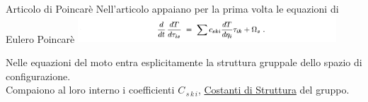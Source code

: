 \documentclass[unknownkeysallowed]{beamer}
\begin{document}
\begin{frame}{Articolo di Poincarè}
Nell'articolo appaiano per la prima volta le equazioni di Eulero Poincarè 
\includegraphics[height=1cm]{Articolo/EP}

\vfill

Nelle equazioni del moto entra esplicitamente la struttura gruppale dello spazio di configurazione.
\\ Compaiono al loro interno i coefficienti $C_{\, s\, k \, i} $, \underline{Costanti di Struttura} del gruppo.



\end{frame}
\end{document}
